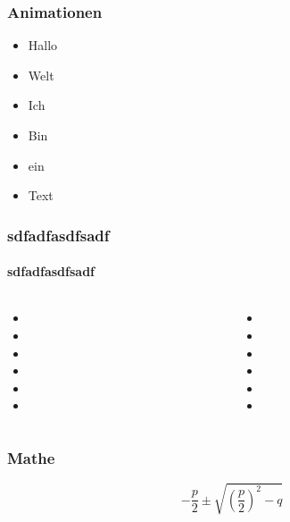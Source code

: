 \documentclass[12pt,ngerman]{beamer}
\begin{document}
\begin{frame}
\frametitle{Animationen}

\begin{itemize}
\item<2> Hallo
\item<-3> Welt
\item<1,3> Ich
\item<1-> Bin
\item ein
\item Text
\end{itemize}
\end{frame}

\begin{frame}
\frametitle{sdfadfasdfsadf}
\framesubtitle{sdfadfasdfsadf}


\begin{columns}
\begin{column}{0.49\textwidth}
\pause
\begin{itemize}
	\item 
	\item 
	\item 
	\item 
	\item 
	\item 
	\end{itemize}
\end{column}
\begin{column}{0.49\textwidth}
\pause
\begin{itemize}
	\item 
	\item 
	\item 
	\item 
	\item 
	\item 
	\end{itemize}
\end{column}
\end{columns}

\end{frame}


\begin{frame}
\frametitle{Mathe}

\begin{equation}
-\frac{p}{2} \pm \sqrt{ \left(\frac{p}{2} \right)^2 -q }
\end{equation}


\end{frame}
\end{document}
